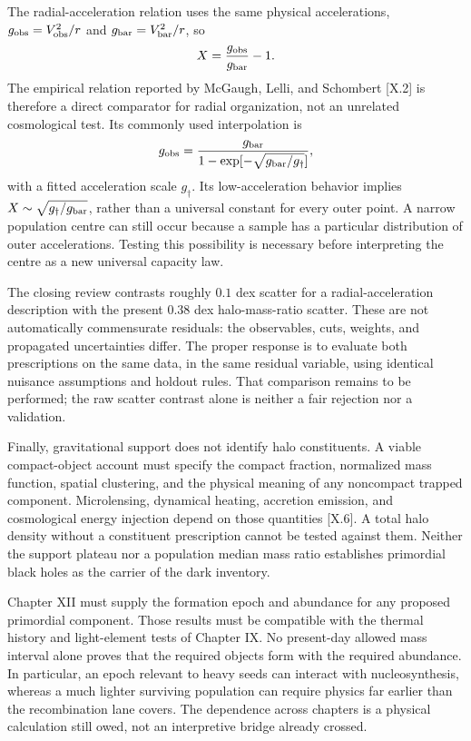 The radial-acceleration relation uses the same physical accelerations, $g_{\rm obs}=V_{\rm obs}^2/r$ and $g_{\rm bar}=V_{\rm bar}^2/r$, so
\begin{equation}
 X=\frac{g_{\rm obs}}{g_{\rm bar}}-1.
 \label{c10:raridentity}
\end{equation}
The empirical relation reported by McGaugh, Lelli, and Schombert [X.2] is therefore a direct comparator for radial organization, not an unrelated cosmological test. Its commonly used interpolation is
\begin{equation}
 g_{\rm obs}=\frac{g_{\rm bar}}
 {1-\exp[-\sqrt{g_{\rm bar}/g_\dagger}]},
 \label{c10:rar}
\end{equation}
with a fitted acceleration scale $g_\dagger$. Its low-acceleration behavior implies $X\sim\sqrt{g_\dagger/g_{\rm bar}}$, rather than a universal constant for every outer point. A narrow population centre can still occur because a sample has a particular distribution of outer accelerations. Testing this possibility is necessary before interpreting the centre as a new universal capacity law.

The closing review contrasts roughly $0.1$ dex scatter for a radial-acceleration description with the present $0.38$ dex halo-mass-ratio scatter. These are not automatically commensurate residuals: the observables, cuts, weights, and propagated uncertainties differ. The proper response is to evaluate both prescriptions on the same data, in the same residual variable, using identical nuisance assumptions and holdout rules. That comparison remains to be performed; the raw scatter contrast alone is neither a fair rejection nor a validation.

Finally, gravitational support does not identify halo constituents. A viable compact-object account must specify the compact fraction, normalized mass function, spatial clustering, and the physical meaning of any noncompact trapped component. Microlensing, dynamical heating, accretion emission, and cosmological energy injection depend on those quantities [X.6]. A total halo density without a constituent prescription cannot be tested against them. Neither the support plateau nor a population median mass ratio establishes primordial black holes as the carrier of the dark inventory.

Chapter XII must supply the formation epoch and abundance for any proposed primordial component. Those results must be compatible with the thermal history and light-element tests of Chapter IX. No present-day allowed mass interval alone proves that the required objects form with the required abundance. In particular, an epoch relevant to heavy seeds can interact with nucleosynthesis, whereas a much lighter surviving population can require physics far earlier than the recombination lane covers. The dependence across chapters is a physical calculation still owed, not an interpretive bridge already crossed.

